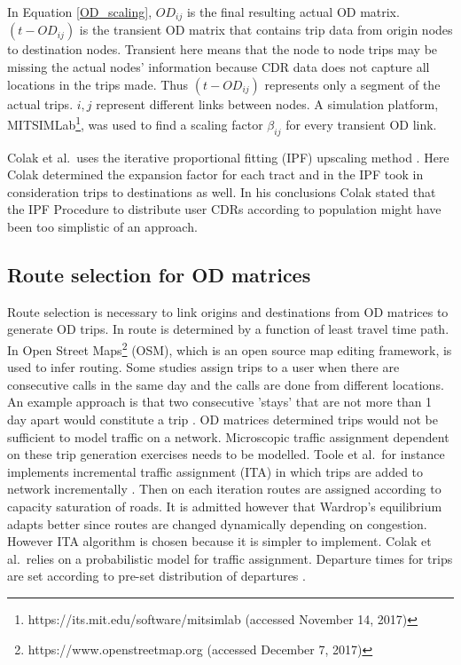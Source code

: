 \documentclass[12pt, a4paper]{report}
\theoremstyle{definition}
\theoremstyle{definition}%
\theoremstyle{definition}%
\theoremstyle{definition}%
\theoremstyle{definition}%
\theoremstyle{definition}%
\begin{document}
In Equation \ref{OD_scaling}, $OD_{ij}$ is the final resulting actual OD matrix.  $(t-OD_{ij})$ is the transient OD matrix that contains trip data from origin nodes to destination nodes. Transient here means that the node to node trips may be missing the actual nodes' information because CDR data does not capture all locations in the trips made. Thus $(t-OD_{ij})$ represents only a segment of the actual trips. $i,j$ represent different links between nodes. A simulation platform, MITSIMLab\footnote{https://its.mit.edu/software/mitsimlab (accessed November 14, 2017)}, was used to find a scaling factor $\beta_{ij}$ for every transient OD link.

Colak et al.\ uses the iterative proportional fitting (IPF) upscaling method \cite{Colak2015}. Here Colak determined the expansion factor for each tract and in the IPF took in consideration trips to destinations as well. In his conclusions Colak stated that the IPF Procedure to distribute user CDRs according to population might have been too simplistic of an approach.


\subsection{Route selection for OD matrices}
Route selection is necessary to link origins and destinations from OD matrices to generate OD trips. In \cite{Iqbal2014} route is determined by a function of least travel time path. In \cite{Toole2015} Open Street Maps\footnote{https://www.openstreetmap.org (accessed December 7, 2017)} (OSM), which is an open source map editing framework, is used to infer routing. Some studies assign trips to a user when there are consecutive calls in the same day and the calls are done from different locations. An example approach is that two consecutive 'stays' that are not more than 1 day apart would constitute a trip \cite{Colak2015,Toole2015}. 
OD matrices determined trips would not be sufficient to model traffic on a network. Microscopic traffic assignment dependent on these trip generation exercises needs to be modelled. Toole et al.\ for instance implements incremental traffic assignment (ITA) in which trips are added to network incrementally \cite{Toole2015}. Then on each iteration routes are assigned according to capacity saturation of roads. It is admitted however that Wardrop's equilibrium  adapts better since routes are changed dynamically depending on congestion. However ITA algorithm is chosen because it is simpler to implement. Colak et al.\ relies on a probabilistic model for traffic assignment. Departure times for trips are set according to pre-set distribution of departures \cite{Colak2015}.
\end{document}
